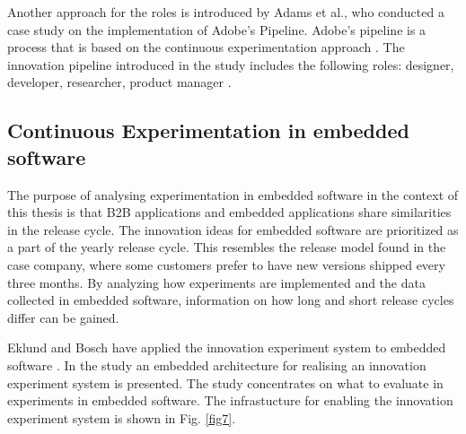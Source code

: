 \documentclass[english, grading]{tktltiki2}
\theoremstyle{definition}
\theoremstyle{remark}
\begin{document}
Another approach for the roles is introduced by Adams et al., who conducted a case study on the implementation of Adobe's Pipeline. Adobe's pipeline is a process that is based on the continuous experimentation approach \cite{adams2013creating, adobe}. The innovation pipeline introduced in the study includes the following roles: designer, developer, researcher, product manager \cite{adobe}.




\subsection{Continuous Experimentation in embedded software}
The purpose of analysing experimentation in embedded software in the context of this thesis is that B2B applications and embedded applications share similarities in the release cycle. The innovation ideas for embedded software are prioritized as a part of the yearly release cycle. This resembles the release model found in the case company, where some customers prefer to have new versions shipped every three months. By analyzing how experiments are implemented and the data collected in embedded software, information on how long and short release cycles differ can be gained. 

Eklund and Bosch have applied the innovation experiment system to embedded software \cite{eklund2012architecture}. In the study an embedded architecture for realising an innovation experiment system is presented. The study concentrates on what to evaluate in experiments in embedded software. The infrastucture for enabling the innovation experiment system is shown in Fig. \ref{fig7}.
\end{document}
